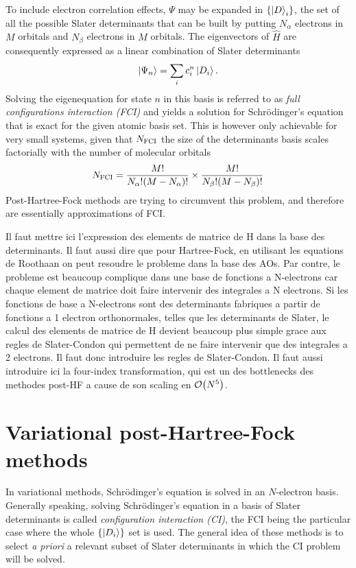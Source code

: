 \documentclass[./thesis.tex]{subfiles}
\begin{document}
To include electron correlation effects, $\Psi$ may be expanded in
$\{\ket D_i \}$, the set of all the possible Slater determinants that can be built by putting $N_\alpha$ electrons in $M$ orbitals and $N_\beta$ electrons in $M$ orbitals.
The eigenvectors of $\widehat{H}$ are consequently expressed as a linear combination of Slater determinants 
\begin{equation}
\ket{\Psi_n} = \sum_{i} c_i^n \ket{D_i}.
\end{equation}
Solving the eigenequation for state $n$ in this basis is referred to as \emph{full configurations interaction (FCI)} and yields a solution for Schrödinger's equation that is exact for the given atomic basis set.
This is however only achievable for very small systems, given that $N_\text{FCI}$ the size of the determinants basis scales factorially with the number of molecular orbitals
\begin{equation}
N_\text{FCI} = \frac{M!}{N_\alpha ! (M-N_\alpha)!} \times \frac{M!}{N_\beta ! (M-N_\beta)!}
\end{equation}
Post-Hartree-Fock methods are trying to circumvent this problem, and therefore are essentially approximations of FCI.

\alert{ Il faut mettre ici l'expression des elements de matrice de H dans la
base des determinants.  Il faut aussi dire que pour Hartree-Fock, en utilisant
les equations de Roothaan on peut resoudre le probleme dans la base des AOs.
Par contre, le probleme est beaucoup complique dans une base de fonctions a
N-electrons car chaque element de matrice doit faire intervenir des integrales
a N electrons.  Si les fonctions de base a N-electrons sont des determinants
fabriques a partir de fonctions a 1 electron orthonormales, telles que les
determinants de Slater, le calcul des elements de matrice de H devient beaucoup
plus simple grace aux regles de Slater-Condon qui permettent de ne faire
intervenir que des integrales a 2 electrons. Il faut donc introduire les regles
de Slater-Condon.  Il faut aussi introduire ici la four-index transformation,
qui est un des bottlenecks des methodes post-HF a cause de son scaling en
$\order{N^5}$.  } 

\section{Variational post-Hartree-Fock methods}

In variational methods, Schrödinger's equation is solved in an $N$-electron basis.
Generally speaking, solving Schrödinger's equation in a basis of Slater determinants is called \emph{configuration interaction (CI)}, the FCI being the particular case where the whole $\{\ket {D_i} \}$ set is used. The general idea of these methods is to select \textit{a priori} a relevant subset of Slater determinants in which the CI problem will be solved.
\end{document}
